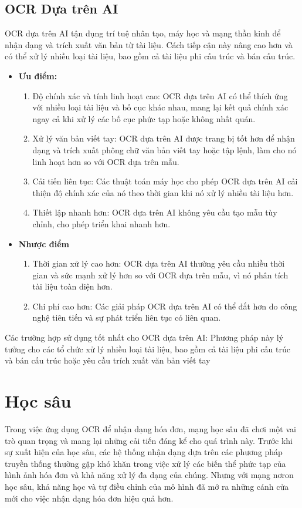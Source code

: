 \subsection{OCR Dựa trên AI}
OCR dựa trên AI tận dụng trí tuệ nhân tạo, máy học và mạng thần kinh để nhận dạng và trích xuất văn bản từ tài liệu. Cách tiếp cận này nâng cao hơn và có thể xử lý nhiều loại tài liệu, bao gồm cả tài liệu phi cấu trúc và bán cấu trúc. \cite{template-ai-ocr}
\begin{itemize}
    \item[] \textbf{Ưu điểm:} \begin{enumerate}
            \item Độ chính xác và tính linh hoạt cao: OCR dựa trên AI có thể thích ứng với nhiều loại tài liệu và bố cục khác nhau, mang lại kết quả chính xác ngay cả khi xử lý các bố cục phức tạp hoặc không nhất quán.
            \item Xử lý văn bản viết tay: OCR dựa trên AI được trang bị tốt hơn để nhận dạng và trích xuất phông chữ văn bản viết tay hoặc tập lệnh, làm cho nó linh hoạt hơn so với OCR dựa trên mẫu.
            \item Cải tiến liên tục: Các thuật toán máy học cho phép OCR dựa trên AI cải thiện độ chính xác của nó theo thời gian khi nó xử lý nhiều tài liệu hơn.
            \item Thiết lập nhanh hơn: OCR dựa trên AI không yêu cầu tạo mẫu tùy chỉnh, cho phép triển khai nhanh hơn.
        \end{enumerate}
    \item[] \textbf{Nhược điểm} \begin{enumerate}
            \item Thời gian xử lý cao hơn: OCR dựa trên AI thường yêu cầu nhiều thời gian và sức mạnh xử lý hơn so với OCR dựa trên mẫu, vì nó phân tích tài liệu toàn diện hơn.
            \item Chi phí cao hơn: Các giải pháp OCR dựa trên AI có thể đắt hơn do công nghệ tiên tiến và sự phát triển liên tục có liên quan.

        \end{enumerate}
\end{itemize}

Các trường hợp sử dụng tốt nhất cho OCR dựa trên AI: Phương pháp này lý tưởng cho các tổ chức xử lý nhiều loại tài liệu, bao gồm cả tài liệu phi cấu trúc và bán cấu trúc hoặc yêu cầu trích xuất văn bản viết tay

\section{Học sâu}
Trong việc ứng dụng OCR để nhận dạng hóa đơn, mạng học sâu đã chơi một vai trò quan trọng và mang lại những cải tiến đáng kể cho quá trình này. Trước khi sự xuất hiện của học sâu, các hệ thống nhận dạng dựa trên các phương pháp truyền thống thường gặp khó khăn trong việc xử lý các biến thể phức tạp của hình ảnh hóa đơn và khả năng xử lý đa dạng của chúng. Nhưng với mạng nơron học sâu, khả năng học và tự điều chỉnh của mô hình đã mở ra những cánh cửa mới cho việc nhận dạng hóa đơn hiệu quả hơn.

